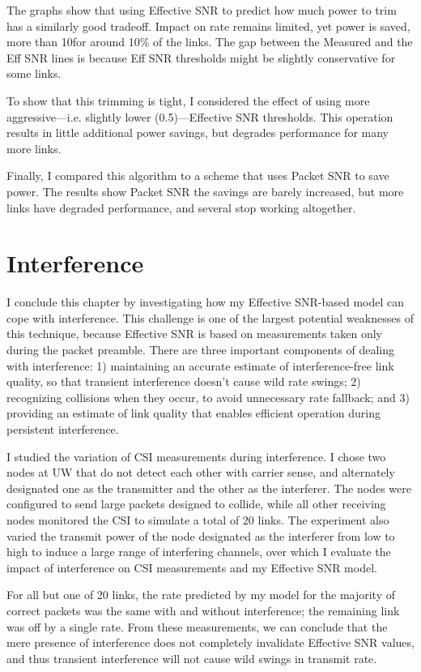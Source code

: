 The graphs show that using Effective SNR to predict how much power to trim has a similarly good tradeoff. Impact on rate remains limited, yet power is saved, more than 10\dB for around 10\% of the links. The gap between the Measured and the Eff SNR lines is because Eff SNR thresholds might be slightly conservative for some links.

To show that this trimming is tight, I considered the effect of using more aggressive---i.e. slightly lower (0.5\dB)---Effective SNR thresholds. This operation results in little additional power savings, but degrades performance for many more links.

Finally, I compared this algorithm to a scheme that uses Packet SNR to save power. The results show Packet SNR the savings are barely increased, but more links have degraded performance, and several stop working altogether.


\section{Interference}
\label{sec:interference}
I conclude this chapter by investigating how my Effective SNR-based model can cope with interference. This challenge is one of the largest potential weaknesses of this technique, because Effective SNR is based on measurements taken only during the packet preamble. There are three important components of dealing with interference: 1) maintaining an accurate estimate of interference-free link quality, so that transient interference doesn't cause wild rate swings; 2) recognizing collisions when they occur, to avoid unnecessary rate fallback; and 3) providing an estimate of link quality that enables efficient operation during persistent interference.

I studied the variation of CSI measurements during interference. I chose two nodes at UW that do not detect each other with carrier sense, and alternately designated one as the transmitter and the other as the interferer. The nodes were configured to send large packets designed to collide, while all other receiving nodes monitored the CSI to simulate a total of 20 links. The experiment also varied the transmit power of the node designated as the interferer from low to high to induce a large range of interfering channels, over which I evaluate the impact of interference on CSI measurements and my Effective SNR model.

For all but one of 20 links, the rate predicted by my model for the majority of correct packets was the same with and without interference; the remaining link was off by a single rate. From these measurements, we can conclude that the mere presence of interference does not completely invalidate Effective SNR values, and thus transient interference will not cause wild swings in transmit rate.

